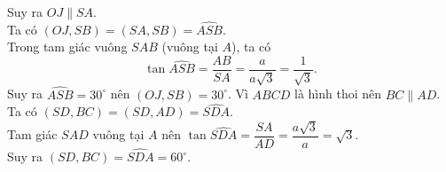 \begin{ex}
{\begin{itemchoice}
			Suy ra  $OJ \parallel SA$.\\
			Ta có $(OJ,SB)=(SA,SB)=\widehat{ASB}$.\\ 
			Trong tam giác vuông $SAB$ (vuông  tại $A$), ta có
			$$\tan \widehat{ASB} = \dfrac{AB}{SA} =  \dfrac{a}{a\sqrt{3}} = \dfrac{1}{\sqrt{3}}.$$
			Suy  ra $\widehat{ASB} = 30^\circ$ nên $(OJ,SB)=30^{\circ}$.
			\itemch 
			Vì  $ABCD$ là hình thoi nên $BC \parallel AD$.\\
			Ta  có $(SD,BC) = (SD,AD) = \widehat{SDA}$.\\
			Tam  giác $SAD$ vuông tại $A$ nên
			$\tan \widehat{SDA} = \dfrac{SA}{AD} = \dfrac{a\sqrt{3}}{a} =  \sqrt{3}$.\\
			Suy ra  $(SD,BC)=\widehat{SDA} = 60^\circ$.
		\end{itemchoice}
	 }
\end{ex}

